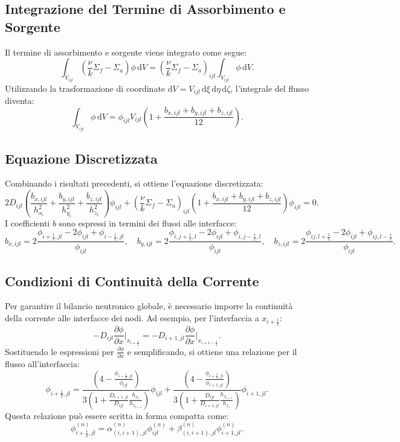 \subsection{Integrazione del Termine di Assorbimento e Sorgente}
Il termine di assorbimento e sorgente viene integrato come segue:
\[
\int_{V_{ijl}} \left( \frac{\nu}{k} \Sigma_f - \Sigma_a \right) \phi \, \mathrm{d}V = \left( \frac{\nu}{k} \Sigma_f - \Sigma_a \right)_{ijl} \int_{V_{ijl}} \phi \, \mathrm{d}V.
\]
Utilizzando la trasformazione di coordinate \(\mathrm{d}V = V_{ijl} \, \mathrm{d}\xi \, \mathrm{d}\eta \, \mathrm{d}\zeta\), l'integrale del flusso diventa:
\[
\int_{V_{ijl}} \phi \, \mathrm{d}V = \phi_{ijl} V_{ijl} \left(1 + \frac{b_{x,ijl} + b_{y,ijl} + b_{z,ijl}}{12}\right).
\]

\subsection{Equazione Discretizzata}
Combinando i risultati precedenti, si ottiene l'equazione discretizzata:
\[
2 D_{ijl} \left( \frac{b_{x,ijl}}{h_{x_i}^2} + \frac{b_{y,ijl}}{h_{y_i}^2} + \frac{b_{z,ijl}}{h_{z_l}^2} \right) \phi_{ijl} + \left( \frac{\nu}{k} \Sigma_f - \Sigma_a \right)_{ijl} \left( 1 + \frac{b_{x,ijl} + b_{y,ijl} + b_{z,ijl}}{12} \right) \phi_{ijl} = 0.
\]
I coefficienti \(b\) sono espressi in termini dei flussi alle interfacce:
\[
b_{x,ijl} = 2 \frac{\phi_{i+\frac{1}{2},jl} - 2\phi_{ijl} + \phi_{i-\frac{1}{2},jl}}{\phi_{ijl}}, \quad b_{y,ijl} = 2 \frac{\phi_{i,j+\frac{1}{2},l} - 2\phi_{ijl} + \phi_{i,j-\frac{1}{2},l}}{\phi_{ijl}}, \quad b_{z,ijl} = 2 \frac{\phi_{ij,l+\frac{1}{2}} - 2\phi_{ijl} + \phi_{ij,l-\frac{1}{2}}}{\phi_{ijl}}.
\]

\subsection{Condizioni di Continuità della Corrente}
Per garantire il bilancio neutronico globale, è necessario imporre la continuità della corrente alle interfacce dei nodi. Ad esempio, per l'interfaccia a \(x_{i+\frac{1}{2}}\):
\[
- D_{ijl} \frac{\partial \phi}{\partial x} \bigg|_{x_{i+\frac{1}{2}}} = - D_{i+1,jl} \frac{\partial \phi}{\partial x} \bigg|_{x_{i+1-\frac{1}{2}}}.
\]
Sostituendo le espressioni per \(\frac{\partial \phi}{\partial x}\) e semplificando, si ottiene una relazione per il flusso all'interfaccia:
\[
\phi_{i+\frac{1}{2},jl} = \frac{\left(4 - \frac{\phi_{i-\frac{1}{2},jl}}{\phi_{ijl}}\right)}{3 \left(1 + \frac{D_{i+1,jl}}{D_{ijl}} \frac{h_{x_i}}{h_{x_{i+1}}}\right)} \phi_{ijl} + \frac{\left(4 - \frac{\phi_{i+\frac{3}{2},jl}}{\phi_{i+1,jl}}\right)}{3 \left(1 + \frac{D_{ijl}}{D_{i+1,jl}} \frac{h_{x_{i+1}}}{h_{x_i}}\right)} \phi_{i+1,jl}.
\]
Questa relazione può essere scritta in forma compatta come:
\[
\phi_{i+\frac{1}{2},jl}^{(n)} = \alpha_{(i,i+1),jl}^{(n)} \phi_{ijl}^{(n)} + \beta_{(i,i+1),jl}^{(n)} \phi_{i+1,jl}^{(n)}.
\]

